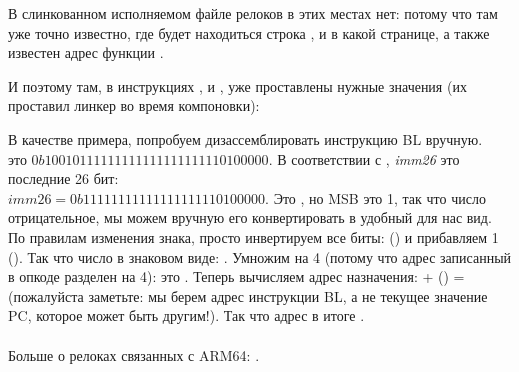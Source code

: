 В слинкованном исполняемом файле релоков в этих местах нет: потому что там уже точно известно, 
где будет находиться строка , и в какой странице, а также известен адрес функции \puts.

И поэтому там, в инструкциях , \ADD и , уже проставлены нужные значения 
(их проставил линкер во время компоновки):




В качестве примера, попробуем дизассемблировать инструкцию BL вручную.\\
 это $0b10010111111111111111111110100000$.
В соответствии с , \emph{imm26} это последние 26 бит:\\
$imm26 = 0b11111111111111111110100000$.
Это , но \ac{MSB} это 1, 
так что число отрицательное, мы можем вручную его конвертировать в удобный для нас вид.
По правилам изменения знака, просто инвертируем все биты: () и прибавляем 1 ().
Так что число в знаковом виде: .
Умножим  на 4 (потому что адрес записанный в опкоде разделен на 4): это .
Теперь вычисляем адрес назначения:  + () =  
(пожалуйста заметьте: мы берем адрес инструкции BL, а не текущее значение \ac{PC}, которое может быть другим!).
Так что адрес в итоге .\\
\\
Больше о релоках связанных с ARM64: \ARMELF.
